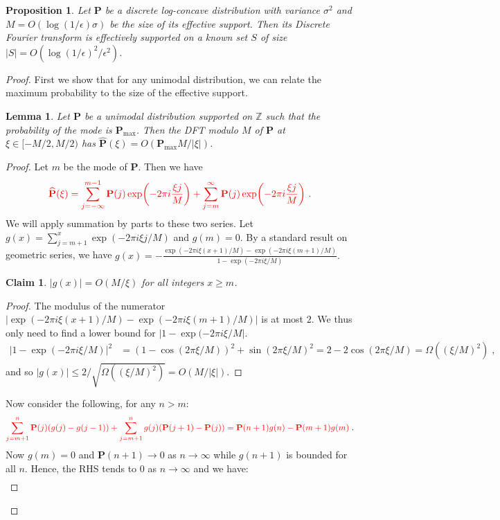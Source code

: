 \documentclass[11pt]{article}
\newcommand{\new}[1]{{\color{red} #1}}
\newcommand{\new}[1]{{#1}}
\newtheorem{lemma}[theorem]{Lemma}
\newtheorem{proposition}[theorem]{Proposition}
\newtheorem{claim}[theorem]{Claim}
\theoremstyle{definition}
\newcommand{\Z}{\mathbb{Z}}
\newcommand{\p}{\mathbf{P}}
\newcommand{\eps}{\epsilon}
\newcommand{\fourier}[1]{\widehat{#1}}
\begin{document}
\begin{proposition} \label{prop:log-concave-sparse-FT} 
Let $\p$ be a discrete log-concave distribution with variance $\sigma^2$ and  $M = O(\log(1/\eps) \sigma)$ be the size of its effective support. 
Then its Discrete Fourier transform is effectively supported on a known set $S$ of size $|S|=O(\log(1/\eps)^2/\eps^2)$. 
\end{proposition}
\begin{proof}
First we show that for any unimodal distribution, we can relate the maximum probability to the size of the effective support.

\begin{lemma} 
Let $\p$ be a unimodal distribution supported on $\Z$ such that the probability of the mode is $\p_{\max}$. 
Then the DFT modulo $M$ of $\p$ at $\xi \in [-M/2,M/2)$ has $\fourier{\p}(\xi)=O(\p_{\max} M/|\xi|)$.
\end{lemma}
\begin{proof}
Let $m$ be the mode of $\p$. Then we have 
\[
\new{\fourier{\p}(\xi)=\sum_{j=-\infty}^{m-1} \p(j) \exp\!\left(-2\pi i \frac{\xi j}{M}\right) + \sum_{j=m}^\infty \p(j) \exp\!\left(-2\pi i \frac{\xi j}{M}\right)\,.}
\]
We will apply summation by parts to these two series. 
Let \new{$g(x) = \sum_{j=m+1}^x \exp(-2\pi i \xi j/M)$} and $g(m)=0$. 
By a standard result on geometric series, we have \new{$g(x)= -\frac{\exp(-2\pi i \xi (x+1)/M) - \exp(-2\pi i \xi (m+1)/M)}{1- \exp(-2\pi i \xi/M)}$.} 
\begin{claim} 
$|g(x)| = O(M/\xi)$ for all integers $x \geq m$. 
\end{claim}
\begin{proof}
The modulus of the numerator \new{$|\exp(-2\pi i \xi (x+1)/M) - \exp(-2\pi i \xi (m+1)/M)|$} is at most $2$. 
We thus only need to find a lower bound for $|1- \exp(-2\pi i \xi/M|$.
\begin{align*}
|1- \exp(-2\pi i \xi/M)|^2 & = (1-\cos(2\pi\xi/M))^2 + \sin(2\pi\xi/M)^2 
 = 2 - 2 \cos(2\pi\xi/M) 
 = \Omega((\xi/M)^2) \;,
\end{align*}
and so $|g(x)| \leq 2/\sqrt{\Omega((\xi/M)^2)}=O(M/|\xi|)$.
\end{proof}
\noindent Now consider the following, for any $n > m$:
\[
  \new{\sum_{j=m+1}^n \p(j) (g(j)-g(j-1)) + \sum_{j=m+1}^n g(j) (\p(j+1)-\p(j))  = \p(n+1)g(n)-\p(m+1)g(m)} \; .
\]
Now $g(m)=0$ and $\p(n+1) \rightarrow 0$ as $n \rightarrow \infty$ while $g(n+1)$ is bounded for all $n$. 
Hence, the RHS tends to $0$ as $n \rightarrow \infty$ and we have:
\begin{align*} 

\end{align*}
\end{proof}
\end{proof}
\end{document}

